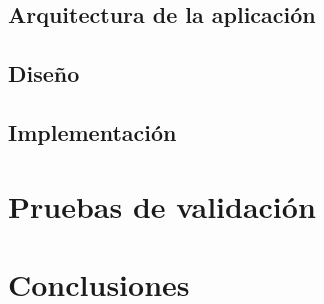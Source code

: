 \documentclass[11pt,a4paper]{book}
\begin{document}
\section{Arquitectura de la aplicación}


\section{Diseño}


\section{Implementación}


\chapter{Pruebas de validación}


\chapter{Conclusiones}


\printbibliography[heading=bibnumbered,title=Referencias	]

%
\end{document}
